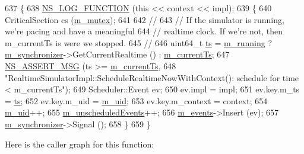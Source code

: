 \begin{DoxyCode}
637 \{
638   \hyperlink{log-macros-disabled_8h_a90b90d5bad1f39cb1b64923ea94c0761}{NS\_LOG\_FUNCTION} (\textcolor{keyword}{this} << context << impl);
639   \{
640     CriticalSection cs (\hyperlink{classns3_1_1RealtimeSimulatorImpl_a02be368e7cbd8a6f9d62db36c3fd373b}{m\_mutex});
641 
642     \textcolor{comment}{//}
643     \textcolor{comment}{// If the simulator is running, we're pacing and have a meaningful }
644     \textcolor{comment}{// realtime clock.  If we're not, then m\_currentTs is were we stopped.}
645     \textcolor{comment}{// }
646     uint64\_t \hyperlink{lte_2model_2fading-traces_2fading__trace__generator_8m_ada841f58d7be618bfbc76c87e7d44086}{ts} = \hyperlink{classns3_1_1RealtimeSimulatorImpl_a4907d7e58b7221984a86d5f63439ea8d}{m\_running} ? \hyperlink{classns3_1_1RealtimeSimulatorImpl_a87a72268b521afcae7ea4c891c398d27}{m\_synchronizer}->GetCurrentRealtime () : 
      \hyperlink{classns3_1_1RealtimeSimulatorImpl_a613ff41dee1e66129c4d5cc81c00cf60}{m\_currentTs};
647     \hyperlink{assert_8h_aff5ece9066c74e681e74999856f08539}{NS\_ASSERT\_MSG} (ts >= \hyperlink{classns3_1_1RealtimeSimulatorImpl_a613ff41dee1e66129c4d5cc81c00cf60}{m\_currentTs}, 
648                    \textcolor{stringliteral}{"RealtimeSimulatorImpl::ScheduleRealtimeNowWithContext(): schedule for time <
       m\_currentTs"});
649     Scheduler::Event ev;
650     ev.impl = impl;
651     ev.key.m\_ts = \hyperlink{lte_2model_2fading-traces_2fading__trace__generator_8m_ada841f58d7be618bfbc76c87e7d44086}{ts};
652     ev.key.m\_uid = \hyperlink{classns3_1_1RealtimeSimulatorImpl_a733827168b695086e183a53f5a0dacf2}{m\_uid};
653     ev.key.m\_context = context;
654     \hyperlink{classns3_1_1RealtimeSimulatorImpl_a733827168b695086e183a53f5a0dacf2}{m\_uid}++;
655     \hyperlink{classns3_1_1RealtimeSimulatorImpl_a1ef7b74c3be3d3febb1f07f8db44fb76}{m\_unscheduledEvents}++;
656     \hyperlink{classns3_1_1RealtimeSimulatorImpl_a0cccd690eafca8285f5cc4d3909a9593}{m\_events}->Insert (ev);
657     \hyperlink{classns3_1_1RealtimeSimulatorImpl_a87a72268b521afcae7ea4c891c398d27}{m\_synchronizer}->Signal ();
658   \}
659 \}
\end{DoxyCode}


Here is the caller graph for this function\+:


